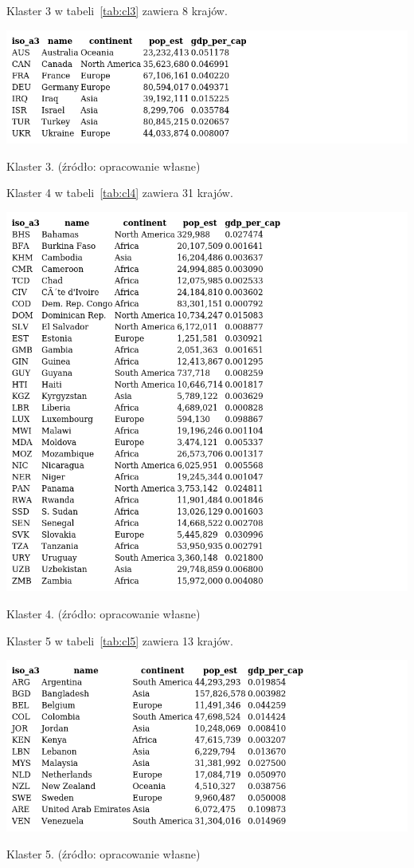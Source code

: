 \documentclass[11pt]{report}
\begin{document}
    Klaster 3 w tabeli~\ref{tab:cl3} zawiera 8 krajów.
    \begin{table}[!htp]
        \centering
        \includegraphics[width=\linewidth]{tables/CLUST/clust3kmeans.png}
        \caption{Klaster 3. (źródło: opracowanie własne)}
        \label{tab:cl3}
    \end{table}

    Klaster 4 w tabeli~\ref{tab:cl4} zawiera 31 krajów.
    \begin{table}[!htp]
        \centering
        \includegraphics[width=\linewidth]{tables/CLUST/clust4kmeans.png}
        \caption{Klaster 4. (źródło: opracowanie własne)}
        \label{tab:cl4}
    \end{table}

    Klaster 5 w tabeli~\ref{tab:cl5} zawiera 13 krajów.
    \begin{table}[!htp]
        \centering
        \includegraphics[width=\linewidth]{tables/CLUST/clust5kmeans.png}
        \caption{Klaster 5. (źródło: opracowanie własne)}
        \label{tab:cl5}
    \end{table}
\end{document}
